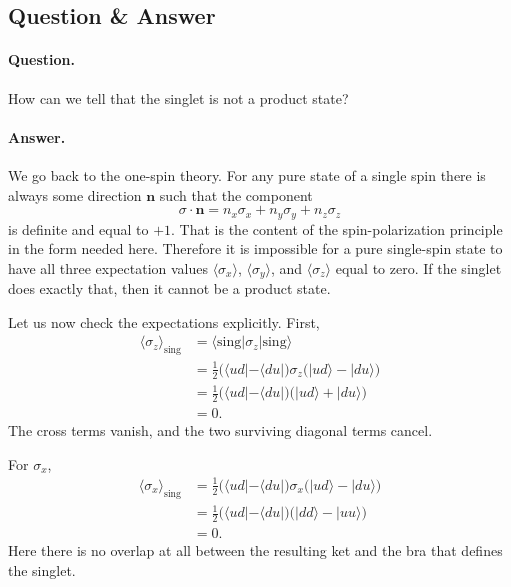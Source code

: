 \subsection{Question \& Answer}

\paragraph{Question.} How can we tell that the singlet is not a product state?

\paragraph{Answer.} We go back to the one-spin theory. For any pure state of a single spin there is always some direction \(\mathbf n\) such that the component
\begin{equation}
\sigma\cdot \mathbf n
=
n_x\sigma_x+n_y\sigma_y+n_z\sigma_z
\end{equation}
is definite and equal to \(+1\). That is the content of the spin-polarization principle in the form needed here. Therefore it is impossible for a pure single-spin state to have all three expectation values \(\langle \sigma_x\rangle\), \(\langle \sigma_y\rangle\), and \(\langle \sigma_z\rangle\) equal to zero. If the singlet does exactly that, then it cannot be a product state.

Let us now check the expectations explicitly. First,
\begin{align}
\langle \sigma_z\rangle_{\mathrm{sing}}
&=
\langle \mathrm{sing}|\sigma_z|\mathrm{sing}\rangle
\nonumber\\
&=
\frac{1}{2}
\bigl(\langle ud|-\langle du|\bigr)
\sigma_z
\bigl(|ud\rangle-|du\rangle\bigr)
\nonumber\\
&=
\frac{1}{2}
\bigl(\langle ud|-\langle du|\bigr)
\bigl(|ud\rangle+|du\rangle\bigr)
\nonumber\\
&=0.
\end{align}
The cross terms vanish, and the two surviving diagonal terms cancel.

For \(\sigma_x\),
\begin{align}
\langle \sigma_x\rangle_{\mathrm{sing}}
&=
\frac{1}{2}
\bigl(\langle ud|-\langle du|\bigr)
\sigma_x
\bigl(|ud\rangle-|du\rangle\bigr)
\nonumber\\
&=
\frac{1}{2}
\bigl(\langle ud|-\langle du|\bigr)
\bigl(|dd\rangle-|uu\rangle\bigr)
\nonumber\\
&=0.
\end{align}
Here there is no overlap at all between the resulting ket and the bra that defines the singlet.

